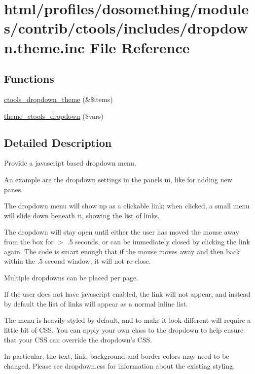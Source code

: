 \hypertarget{dropdown_8theme_8inc}{
\section{html/profiles/dosomething/modules/contrib/ctools/includes/dropdown.theme.inc File Reference}
\label{dropdown_8theme_8inc}
}
\subsection*{Functions}
\begin{DoxyCompactItemize}
\item 
\hyperlink{dropdown_8theme_8inc_a896a70c94dd269a16949457d7da86d41}{ctools\_\-dropdown\_\-theme} (\&\$items)
\item 
\hyperlink{dropdown_8theme_8inc_a8343d27a7f44c9ecd888fc539a900bfd}{theme\_\-ctools\_\-dropdown} (\$vars)
\end{DoxyCompactItemize}


\subsection{Detailed Description}
Provide a javascript based dropdown menu.

An example are the dropdown settings in the panels ui, like for adding new panes.

The dropdown menu will show up as a clickable link; when clicked, a small menu will slide down beneath it, showing the list of links.

The dropdown will stay open until either the user has moved the mouse away from the box for $>$ .5 seconds, or can be immediately closed by clicking the link again. The code is smart enough that if the mouse moves away and then back within the .5 second window, it will not re-\/close.

Multiple dropdowns can be placed per page.

If the user does not have javascript enabled, the link will not appear, and instead by default the list of links will appear as a normal inline list.

The menu is heavily styled by default, and to make it look different will require a little bit of CSS. You can apply your own class to the dropdown to help ensure that your CSS can override the dropdown's CSS.

In particular, the text, link, background and border colors may need to be changed. Please see dropdown.css for information about the existing styling. 


